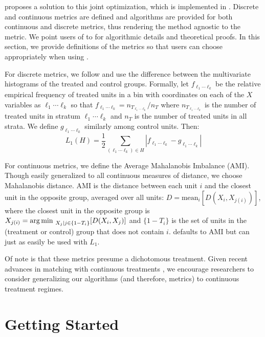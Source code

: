 \documentclass[nojss]{jss}
\newcommand{\argmin}{\operatornamewithlimits{arg\,min\ }}
\newcommand{\mean}{\text{mean}}
\begin{document}
\citet{iacusND} proposes a solution to this joint optimization, which
is implemented in . Discrete and continuous
metrics are defined and algorithms are provided for both continuous
and discrete metrics, thus rendering the method agnostic to the
metric. We point users of  to \citet{kingND} for
algorithmic details and theoretical proofs. In this section, we
provide definitions of the metrics so that users can choose
appropriately when using .

For discrete metrics, we follow \citep{iacus2011b} and use the
difference between the multivariate histograms of the treated and
control groups. Formally, let $f_{\ell_1\cdots \ell_k}$ be the
relative empirical frequency of treated units in a bin with
coordinates on each of the $X$ variables as $\ell_1\cdots \ell_k$ so
that $f_{\ell_1\cdots \ell_k}=n_{T_{\ell_1\cdots \ell_k}}/n_T$ where
$n_{T_{\ell_1\cdots \ell_k}}$ is the number of treated units in
stratum $\ell_1\cdots \ell_k$ and $n_T$ is the number of treated units
in all strata. We define $g_{\ell_1\cdots \ell_k}$ similarly among
control units. Then:
\begin{equation}\label{eq:L1} 
  L_1(H) =\frac{1}{2} \sum_{(\ell_1
    \cdots \ell_k) \in H} |f_{\ell_1\cdots \ell_k} - g_{\ell_1\cdots
    \ell_k}| 
\end{equation} 

For continuous metrics, we define the Average Mahalanobis Imbalance
(AMI). Though easily generalized to all continuous measures of
distance, we choose Mahalanobis distance. AMI is the distance between
each unit $i$ and the closest unit in the opposite group, averaged
over all units: $D=\mean_i [D(X_i,X_{j(i)})]$, where the closest unit
in the opposite group is
$X_{j(i)}=\argmin_{X_j|j\in\{1-T_i\}}[D(X_i,X_j)]$ and $\{1-T_i\}$ is
the set of units in the (treatment or control) group that does not
contain $i$.  defaults to AMI but can just as
easily be used with $L_1$.

Of note is that these metrics presume a dichotomous treatment.  Given
recent advances in matching with continuous treatments \citep{iacusND,
  ratkovicND}, we encourage researchers to consider generalizing our
algorithms (and therefore, metrics) to continuous treatment regimes.

\section[Getting Started]{Getting Started}
\end{document}
